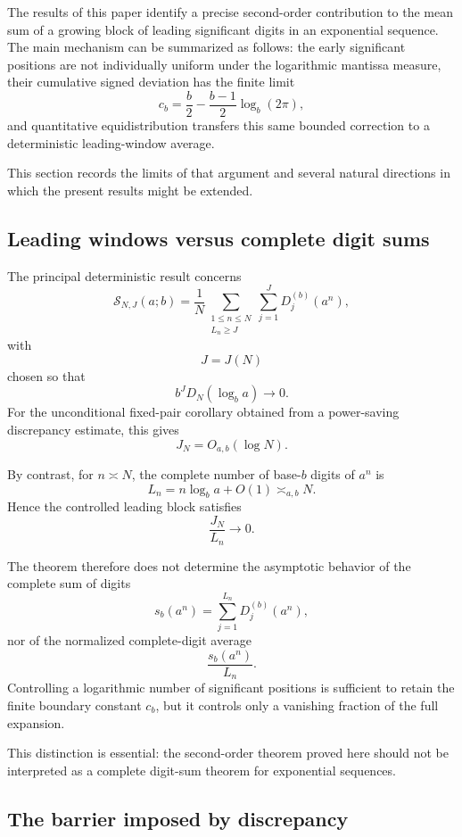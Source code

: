 \documentclass[11pt]{article}
\theoremstyle{definition}
\theoremstyle{remark}
\begin{document}
The results of this paper identify a precise second-order contribution
to the mean sum of a growing block of leading significant digits in an
exponential sequence.  The main mechanism can be summarized as follows:
the early significant positions are not individually uniform under the
logarithmic mantissa measure, their cumulative signed deviation has the
finite limit
\[
    c_b
    =
    \frac b2
    -
    \frac{b-1}{2}\log_b(2\pi),
\]
and quantitative equidistribution transfers this same bounded correction
to a deterministic leading-window average.

This section records the limits of that argument and several natural
directions in which the present results might be extended.


\subsection{Leading windows versus complete digit sums}
\label{subsec:leading-vs-complete}

The principal deterministic result concerns
\[
    \mathcal S_{N,J}(a;b)
    =
    \frac1N
    \sum_{\substack{1\le n\le N\\L_n\ge J}}
    \sum_{j=1}^{J}D_j^{(b)}(a^n),
\]
with
\[
    J=J(N)
\]
chosen so that
\[
    b^J D_N(\log_b a)\longrightarrow0.
\]
For the unconditional fixed-pair corollary obtained from a power-saving
discrepancy estimate, this gives
\[
    J_N=O_{a,b}(\log N).
\]

By contrast, for \(n\asymp N\), the complete number of base-\(b\)
digits of \(a^n\) is
\[
    L_n
    =
    n\log_b a+O(1)
    \asymp_{a,b}N.
\]
Hence the controlled leading block satisfies
\[
    \frac{J_N}{L_n}\longrightarrow0.
\]

The theorem therefore does not determine the asymptotic behavior of
the complete sum of digits
\[
    s_b(a^n)
    =
    \sum_{j=1}^{L_n}D_j^{(b)}(a^n),
\]
nor of the normalized complete-digit average
\[
    \frac{s_b(a^n)}{L_n}.
\]
Controlling a logarithmic number of significant positions is sufficient
to retain the finite boundary constant \(c_b\), but it controls only a
vanishing fraction of the full expansion.

This distinction is essential: the second-order theorem proved here
should not be interpreted as a complete digit-sum theorem for
exponential sequences.


\subsection{The barrier imposed by discrepancy}
\label{subsec:discrepancy-barrier}
\end{document}
